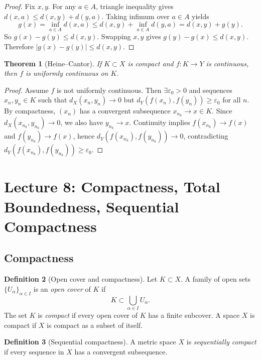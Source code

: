 \documentclass[11pt]{article}
\newtheorem{theorem}{Theorem}[section]
\theoremstyle{definition}
\newtheorem{definition}[theorem]{Definition}
\newcommand{\eps}{\varepsilon}
\begin{document}
\begin{proof}
Fix $x,y$. For any $a\in A$, triangle inequality gives $d(x,a)\le d(x,y)+d(y,a)$.
Taking infimum over $a\in A$ yields
\[
g(x)=\inf_{a\in A} d(x,a)\le d(x,y)+\inf_{a\in A} d(y,a)=d(x,y)+g(y).
\]
So $g(x)-g(y)\le d(x,y)$. Swapping $x,y$ gives $g(y)-g(x)\le d(x,y)$.
Therefore $|g(x)-g(y)|\le d(x,y)$.
\end{proof}

\begin{theorem}[Heine--Cantor]
If $K\subset X$ is compact and $f:K\to Y$ is continuous, then $f$ is uniformly continuous on $K$.
\end{theorem}

\begin{proof}
Assume $f$ is not uniformly continuous. Then $\exists \eps_0>0$ and sequences $x_n,y_n\in K$ such that
$d_X(x_n,y_n)\to 0$ but $d_Y(f(x_n),f(y_n))\ge \eps_0$ for all $n$.
By compactness, $(x_n)$ has a convergent subsequence $x_{n_k}\to x\in K$.
Since $d_X(x_{n_k},y_{n_k})\to 0$, we also have $y_{n_k}\to x$.
Continuity implies $f(x_{n_k})\to f(x)$ and $f(y_{n_k})\to f(x)$, hence $d_Y(f(x_{n_k}),f(y_{n_k}))\to 0$,
contradicting $d_Y(f(x_{n_k}),f(y_{n_k}))\ge \eps_0$.
\end{proof}

\section{Lecture 8: Compactness, Total Boundedness, Sequential Compactness}

\subsection{Compactness}

\begin{definition}[Open cover and compactness]
Let $K\subset X$. A family of open sets $\{U_\alpha\}_{\alpha\in I}$ is an \emph{open cover} of $K$ if
\[
K\subset \bigcup_{\alpha\in I} U_\alpha.
\]
The set $K$ is \emph{compact} if every open cover of $K$ has a finite subcover.
A space $X$ is compact if $X$ is compact as a subset of itself.
\end{definition}

\begin{definition}[Sequential compactness]
A metric space $X$ is \emph{sequentially compact} if every sequence in $X$ has a convergent subsequence.
\end{definition}
\end{document}
